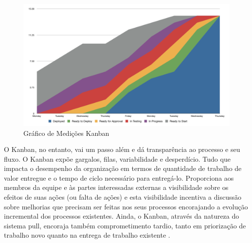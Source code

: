 \begin{figure}[h]
		\centering
		\label{fig05}
			\includegraphics[scale=0.4]{figuras/metricasKanban.png}
		\caption{Gráfico de Medições Kanban  \cite{klipp}}
\end{figure}

O Kanban, no entanto, vai um passo além e dá transparência ao processo e seu fluxo. O Kanban expõe gargalos, filas, variabilidade e desperdício. Tudo que impacta o desempenho da organização em termos de quantidade de trabalho de valor entregue e o tempo de ciclo necessário para entregá-lo. Proporciona aos membros da equipe e às partes interessadas externas a visibilidade sobre os efeitos de suas ações (ou falta de ações) e esta visibilidade incentiva a discussão sobre melhorias que precisam ser feitas nos seus processos encorajando a evolução incremental dos processos existentes. Ainda, o  Kanban, através da natureza do sistema pull, encoraja também comprometimento tardio, tanto em priorização de trabalho novo quanto na entrega de trabalho existente \cite{kniberg2009}. 
